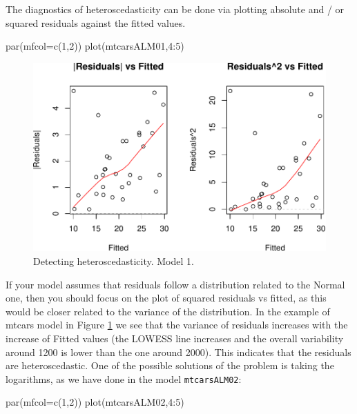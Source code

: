 \documentclass[
]{book}
\newenvironment{Shaded}{\begin{snugshade}}{\end{snugshade}}
\newcommand{\AttributeTok}[1]{\textcolor[rgb]{0.77,0.63,0.00}{#1}}
\newcommand{\DecValTok}[1]{\textcolor[rgb]{0.00,0.00,0.81}{#1}}
\newcommand{\FunctionTok}[1]{\textcolor[rgb]{0.00,0.00,0.00}{#1}}
\newcommand{\NormalTok}[1]{#1}
\newcommand{\SpecialCharTok}[1]{\textcolor[rgb]{0.00,0.00,0.00}{#1}}
\theoremstyle{definition}
\theoremstyle{definition}
\theoremstyle{definition}
\theoremstyle{definition}
\theoremstyle{remark}
\begin{document}
The diagnostics of heteroscedasticity can be done via plotting absolute and / or squared residuals against the fitted values.

\begin{Shaded}
\begin{Highlighting}[]
\FunctionTok{par}\NormalTok{(}\AttributeTok{mfcol=}\FunctionTok{c}\NormalTok{(}\DecValTok{1}\NormalTok{,}\DecValTok{2}\NormalTok{))}
\FunctionTok{plot}\NormalTok{(mtcarsALM01,}\DecValTok{4}\SpecialCharTok{:}\DecValTok{5}\NormalTok{)}
\end{Highlighting}
\end{Shaded}

\begin{figure}
\centering
\includegraphics{Svetunkov---Statistics-for-Business-Analytics_files/figure-latex/diagnostics10-1.pdf}
\caption{\label{fig:diagnostics10}Detecting heteroscedasticity. Model 1.}
\end{figure}

If your model assumes that residuals follow a distribution related to the Normal one, then you should focus on the plot of squared residuals vs fitted, as this would be closer related to the variance of the distribution. In the example of mtcars model in Figure \ref{fig:diagnostics10} we see that the variance of residuals increases with the increase of Fitted values (the LOWESS line increases and the overall variability around 1200 is lower than the one around 2000). This indicates that the residuals are heteroscedastic. One of the possible solutions of the problem is taking the logarithms, as we have done in the model \texttt{mtcarsALM02}:

\begin{Shaded}
\begin{Highlighting}[]
\FunctionTok{par}\NormalTok{(}\AttributeTok{mfcol=}\FunctionTok{c}\NormalTok{(}\DecValTok{1}\NormalTok{,}\DecValTok{2}\NormalTok{))}
\FunctionTok{plot}\NormalTok{(mtcarsALM02,}\DecValTok{4}\SpecialCharTok{:}\DecValTok{5}\NormalTok{)}
\end{Highlighting}
\end{Shaded}
\end{document}
